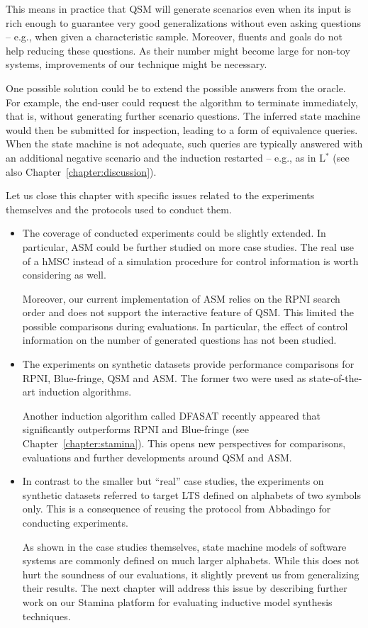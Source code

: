 \begin{itemize}
This means in practice that QSM will generate scenarios even when its input is rich enough to guarantee very good generalizations without even asking questions -- e.g., when given a characteristic sample. Moreover, fluents and goals do not help reducing these questions. As their number might become large for non-toy systems, improvements of our technique might be necessary.

One possible solution could be to extend the possible answers from the oracle. For example, the end-user could request  the algorithm to terminate immediately, that is, without generating further scenario questions. The inferred state machine would then be submitted for inspection, leading to a form of equivalence queries. When the state machine is not adequate, such queries are typically answered with an additional negative scenario and the induction restarted -- e.g., as in L$^*$ \cite{Angluin:1987} (see also Chapter~\ref{chapter:discussion}).

\end{itemize}

Let us close this chapter with specific issues related to the experiments themselves and the protocols used to conduct them. 
\begin{itemize}

\item The coverage of conducted experiments could be slightly extended. In particular, ASM could be further studied on more case studies. The real use of a hMSC instead of a simulation procedure for control information is worth considering as well.

Moreover, our current implementation of ASM relies on the RPNI search order and does not support the interactive feature of QSM. This limited the possible comparisons during evaluations. In particular, the effect of control information on the number of generated questions has not been studied.

\item The experiments on synthetic datasets provide performance comparisons for RPNI, Blue-fringe, QSM and ASM. The former two were used as state-of-the-art induction algorithms. 

Another induction algorithm called DFASAT recently appeared that significantly outperforms RPNI and Blue-fringe \cite{Heule:2010} (see Chapter~\ref{chapter:stamina}). This opens new perspectives for comparisons, evaluations and further developments around QSM and ASM. 

\item In contrast to the smaller but ``real'' case studies, the experiments on synthetic datasets referred to target LTS defined on alphabets of two symbols only. This is a consequence of reusing the protocol from Abbadingo for conducting experiments. 

As shown in the case studies themselves, state machine models of software systems are commonly defined on much larger alphabets. While this does not hurt the soundness of our evaluations, it slightly prevent us from generalizing their results. The next chapter will address this issue by describing further work on our Stamina platform for evaluating inductive model synthesis techniques.
\end{itemize}

